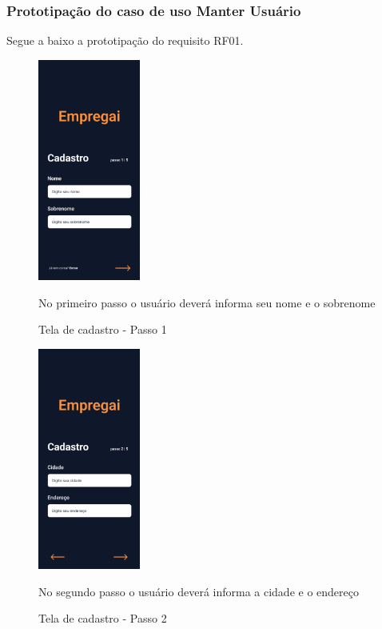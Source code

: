 \subsubsection{ Prototipação do caso de uso Manter Usuário}
	Segue a baixo a prototipação do requisito RF01.
\begin{figure}[hbb]
	\caption{Tela de cadastro - Passo 1}
	\begin{center}
		\includegraphics[width=0.3\textwidth]{images/Cadastro-1.png}
	\end{center}
	No primeiro passo o usuário deverá informa seu nome e o sobrenome
\end{figure}

\begin{figure}[hbb]
	\caption{Tela de cadastro - Passo 2}
	\begin{center}
		\includegraphics[width=0.3\textwidth]{images/Cadastro-2.png}
	\end{center}
	No segundo passo o usuário deverá informa a cidade e o endereço
\end{figure}


